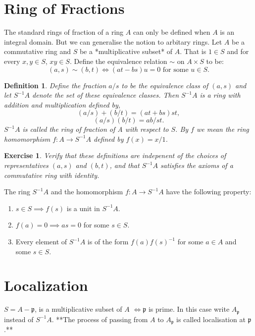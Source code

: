 \documentclass[]{report}
\newtheorem{defn}[theorem]{Definition}
\newtheorem{exercise}[theorem]{Exercise}
\begin{document}
\section{Ring of Fractions}

The standard rings of fraction of a ring $A$ can only be defined when $A$ is an integral domain. But we can generalise the notion to arbitary rings. Let $A$ be a commutative ring and $S$ be a *multiplicative subset* of $A$. That is $1\in S$ and for every $x,y\in S$, $xy\in S$. Define the equivalence relation $\sim$ on $A\times S$ to be:
$$(a,s) \sim (b,t) \Leftrightarrow (at-bs)u=0 \text{ for some } u\in S.$$

\begin{defn}
    Define the fraction $a/s$ to be the equivalence class of $(a,s)$ and let $S^{-1}A$ denote the set of these equivalence classes. Then $S^{-1}A$ is a ring with addition and multiplication defined by,
$$(a/s) + (b/t) = (at+bs)st,$$
$$(a/s)(b/t) = ab/st.$$
$S^{-1}A$ is called the ring of fraction of A with respect to $S$. By $f$ we mean the ring homomorphism $f: A \rightarrow S^{-1}A$ defined by $f(x) = x/1$. 
\end{defn}

\begin{exercise}
    Verify that these definitions are indepenent of the choices of representatives $(a,s)$ and $(b,t)$, and that $S^{-1}A$ satisfies the axioms of a commutative ring with identity.
\end{exercise}

The ring $S^{-1}A$ and the homomorphism $f:A\rightarrow S^{-1}A$ have the following property:
\begin{enumerate}
    \item $s\in S \implies f(s)$ is a unit in $S^{-1}A$. 
    \item $f(a) = 0 \implies as = 0$ for some $s\in S$. 
    \item Every element of $S^{-1}A$ is of the form $f(a)f(s)^{-1}$ for some $a\in A$ and some $s\in S$. 
\end{enumerate}

\section{Localization}

$S = A - \mathfrak{p}$, is a multiplicative subset of $A$ $\Leftrightarrow \mathfrak{p}$ is prime. In this case write $A_\mathfrak{p}$ instead of $S^{-1}A$. **The process of passing from $A$ to $A_\mathfrak{p}$ is called localisation at $\mathfrak{p}$.**
\end{document}
